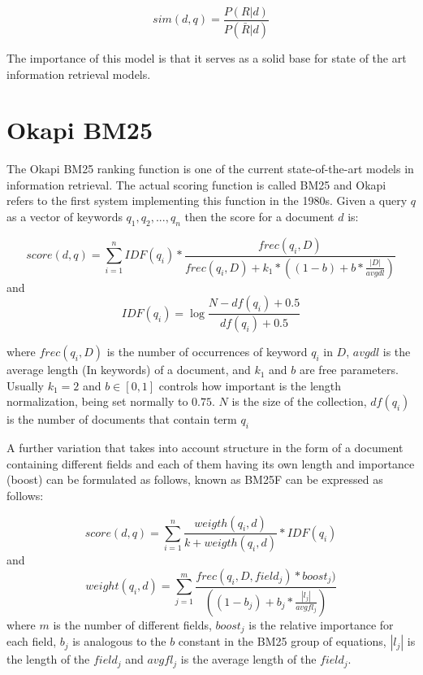 $$sim(d,q) = \frac{ P(R|d)} {P(\bar{R} |d)} $$

The importance of this model is that it serves as a solid base for state of the art information retrieval models.

\section{Okapi BM25}

The Okapi BM25 ranking function is one of the current state-of-the-art models in information retrieval\cite{okapibm25}. The actual scoring function is called BM25 and Okapi refers to the first system implementing this function in the 1980s. 
Given a query $q$ as a vector of keywords $q_{1}, q_{2}, ... , q_{n}$ then the score for a document $d$ is:

$$score(d, q) = \sum_{i=1}^{n}IDF{(q_i)}*\frac{ frec(q_i, D)}{frec(q_i, D)+k_1*((1-b)+b*\frac{|D|}{avgdl})} $$
and $$IDF(q_i) = \log{\frac{N - df(q_i)+0.5}{df(q_i)+0.5}} $$

where $frec(q_i, D)$ is the number of occurrences of keyword $q_i$ in $D$, $avgdl$ is the average length (In keywords) of a document, and $k_1$ and $b$ are free parameters. Usually $k_1 = 2$ and $b \in [0, 1]$ controls how important is the length normalization, being set normally to $0.75$. $N$ is the size of the collection, $df(q_i)$ is the number of documents that contain term $q_i$ 

A further variation that takes into account structure in the form of a document containing different fields and each of them having its own length and importance (boost) can be formulated as follows, known as BM25F can be expressed as follows:


$$score(d, q) = \sum_{i=1}^{n} \frac{weigth(q_i, d)}{k+ weigth(q_i, d)} * IDF(q_i)$$
and 
$$weight(q_i, d) = \sum_{j=1}^m \frac{frec(q_i, D, field_j)*boost_j)}{((1-b_j) + b_j*\frac{|l_j|}{avgfl_j})} $$
where $m$ is the number of different fields, $boost_j$ is the relative importance for each field, $b_j$ is analogous to the $b$ constant in the BM25 group of equations, $|l_j|$ is the length of the $field_j$ and $avgfl_j$ is the average length of the $field_j$.

